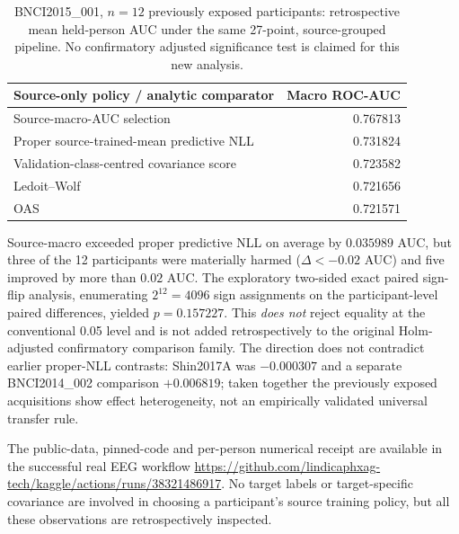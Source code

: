 \begin{table}[tb]
\centering\small
\caption{BNCI2015\_001, $n=12$ previously exposed
participants: retrospective mean held-person AUC
under the same 27-point, source-grouped pipeline.
No confirmatory adjusted significance test
is claimed for this new analysis.}
\label{tab:p1-correct-predictive-bnci2015}
\begin{tabular}{lr}
\toprule
Source-only policy / analytic comparator & Macro ROC-AUC\\
\midrule
Source-macro-AUC selection & 0.767813\\
Proper source-trained-mean predictive NLL & 0.731824\\
Validation-class-centred covariance score & 0.723582\\
Ledoit--Wolf & 0.721656\\
OAS & 0.721571\\
\bottomrule
\end{tabular}
\end{table}
Source-macro exceeded proper predictive NLL
on average by $0.035989$ AUC, but three of
the 12 participants were materially harmed
($\Delta<-0.02$ AUC) and five improved by
more than $0.02$ AUC. The exploratory
two-sided exact paired sign-flip analysis,
enumerating $2^{12}=4096$ sign assignments
on the participant-level paired differences,
yielded $p=0.157227$.
This \emph{does not} reject equality
at the conventional 0.05 level and is
not added retrospectively to the original
Holm-adjusted confirmatory comparison family.
The direction does not contradict earlier
proper-NLL contrasts: Shin2017A was
$-0.000307$ and a separate BNCI2014\_002
comparison $+0.006819$; taken together
the previously exposed acquisitions show
effect heterogeneity, not an empirically
validated universal transfer rule.

The public-data, pinned-code and per-person
numerical receipt are available in the
successful real EEG workflow
\url{https://github.com/lindicaphxag-tech/kaggle/actions/runs/38321486917}.
No target labels or target-specific covariance
are involved in choosing a participant's
source training policy, but all these
observations are retrospectively inspected.

